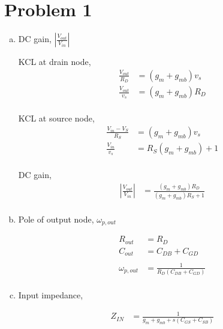 \documentclass{article}
\begin{document}
\section{Problem 1}
\label{sec:org2fb1c6b}
\begin{enumerate}[(a)]
\item DC gain, \(|\frac{V_{out}}{V_{in}}|\)

KCL at drain node,
\begin{equation*}
\begin{aligned}
\frac{V_{out}}{R_{D}} &= (g_{m} + g_{mb})v_{s} \\
\frac{V_{out}}{v_{s}} &= (g_{m} + g_{mb})R_{D} \\
\end{aligned}
\end{equation*}

KCL at source node,
\begin{equation*}
\begin{aligned}
\frac{V_{in} - V_{S}}{R_{S}} &= (g_{m} + g_{mb})v_{s} \\
\frac{V_{in}}{v_{s}} &= R_{S}(g_{m} + g_{mb}) + 1 \\
\end{aligned}
\end{equation*}

DC gain,
\begin{equation*}
\begin{aligned}
|\frac{V_{out}}{V_{in}}| &= \frac{(g_{m} + g_{mb})R_{D}}{(g_{m} + g_{mb})R_{S} + 1} \\
\end{aligned}
\end{equation*}

\item Pole of output node, \(\omega_{p,out}\)

\begin{equation*}
\begin{aligned}
R_{out} &= R_{D} \\
C_{out} &= C_{DB} + C_{GD} \\
\\
\omega_{p,out} &= \frac{1}{R_{D}(C_{DB} + C_{GD})} \\
\end{aligned}
\end{equation*}

\item Input impedance,

\begin{equation*}
\begin{aligned}
Z_{IN} &= \frac{1}{g_{m} + g_{mb} + s(C_{GS} + C_{SB})} \\
\end{aligned}
\end{equation*}


\end{enumerate}
\end{document}
